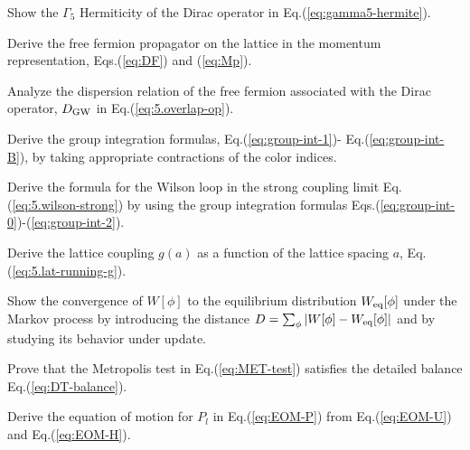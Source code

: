 \begin{prob}\label{prob:3}
Show the $\Gamma_5$ Hermiticity of the Dirac operator in Eq.(\ref{eq:gamma5-hermite}).
\end{prob}

\begin{prob}\label{prob:4}
Derive  the free fermion propagator on the lattice in the momentum representation,
Eqs.(\ref{eq:DF}) and (\ref{eq:Mp}). 
\end{prob}

\begin{prob}\label{prob:5}
Analyze the dispersion relation of the free fermion associated with the 
Dirac operator, $D_{\rm GW}$ in Eq.(\ref{eq:5.overlap-op}).
\end{prob}

\begin{prob}\label{prob:6}
Derive the group integration formulas, Eq.(\ref{eq:group-int-1})- Eq.(\ref{eq:group-int-B}), by taking appropriate 
contractions of the color indices.
\end{prob}


\begin{prob}\label{prob:7}
Derive the formula for the Wilson loop in the strong coupling limit Eq.(\ref{eq:5.wilson-strong}) by using the group integration formulas
Eqs.(\ref{eq:group-int-0})-(\ref{eq:group-int-2}). 
\end{prob}

\begin{prob}\label{prob:8}
Derive the lattice coupling $g(a)$ as a function of the lattice spacing $a$, Eq.(\ref{eq:5.lat-running-g}).
\end{prob}

\begin{prob}\label{prob:9}
Show the convergence of $W[\phi]$ to the equilibrium distribution $W_{\rm eq}[\phi]$
under the Markov process by introducing the distance $D= \sum_{\phi} \left| W[\phi] -W_{\rm eq}[\phi] \right| $
 and by studying its behavior under update.
\end{prob}

\begin{prob}\label{prob:10}
Prove that the Metropolis test in Eq.(\ref{eq:MET-test})
satisfies the detailed balance Eq.(\ref{eq:DT-balance}).
\end{prob}

\begin{prob}\label{prob:11}
Derive the equation of motion for $P_l$ in Eq.(\ref{eq:EOM-P})
from Eq.(\ref{eq:EOM-U}) and  Eq.(\ref{eq:EOM-H}).
\end{prob}

